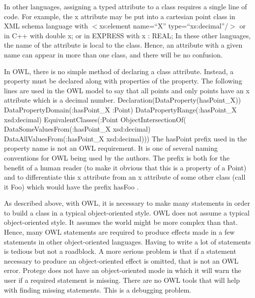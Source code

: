 In other languages, assigning a typed attribute to a class requires a
single line of code. For example, the x attribute may be put into a
cartesian point class in XML schema language with
\newline \sf $<$xs:element name=``X'' type=``xs:decimal''/$>$\rm
\newline or in C++ with
\newline \sf double x; \rm
\newline or in EXPRESS with
\newline \sf x : REAL; \rm \newline
In these other languages, the name of the attribute is local to the class.
Hence, an attribute with a given name can appear in more than one class, and
there will be no confusion.

In OWL, there is no simple method of declaring a class attribute. Instead,
a property must be declared along with properties of the property. The
following lines are used in the OWL model to say that all points and only
points have an x attribute which is a decimal number.
\newline
\newline \sf Declaration(DataProperty(hasPoint\_X))
\newline DataPropertyDomain(:hasPoint\_X :Point)
\newline DataPropertyRange(:hasPoint\_X xsd:decimal)
\newline EquivalentClasses(:Point ObjectIntersectionOf(
\newline DataSomeValuesFrom(:hasPoint\_X xsd:decimal)
\newline DataAllValuesFrom(:hasPoint\_X xsd:decimal))) \rm \newline
\newline
The \sf hasPoint \rm prefix used in the property name is not an OWL
requirement. It is one of several naming conventions for OWL being used by
the authors. The prefix is both for the benefit of a human reader (to make
it obvious that this is a property of a Point) and to differentiate this x
attribute from an x attribute of some other class (call it \sf Foo\rm)
which would have the prefix \sf hasFoo \rm.

As described above, with OWL, it is necessary to make many statements in
order to build a class in a typical object-oriented style. OWL does not
assume a typical object-oriented style. It assumes the world might be more
complex than that. Hence, many OWL statements are required to produce
effects made in a few statements in other object-oriented languages. Having
to write a lot of statements is tedious but not a roadblock. A more serious
problem is that if a statement necessary to produce an object-oriented
effect is omitted, that is not an OWL error. Protege does not have an
object-oriented mode in which it will warn the user if a required statement
is missing. There are no OWL tools that will help with finding missing
statements. This is a debugging problem.

